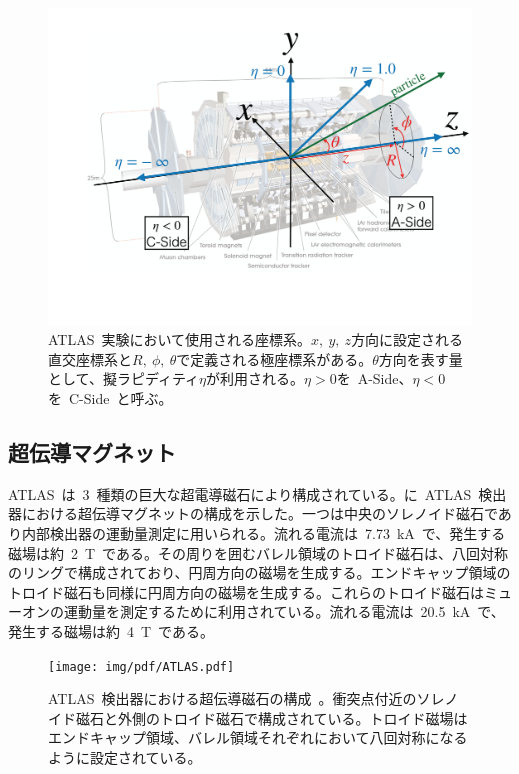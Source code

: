 \begin{figure}[H]
    \centering  
    \includegraphics[width=\textwidth,page=1]{img/pdf/cood.pdf}
    \caption[ATLAS~実験において使用される座標系]{ATLAS~実験において使用される座標系。$x,~y,~z$方向に設定される直交座標系と$R,~\phi,~\theta$で定義される極座標系がある。$\theta$方向を表す量として、擬ラピディティ$\eta$が利用される。$\eta>0$を~A-Side、$\eta<0$を~C-Side~と呼ぶ。}\label{fig:cood}
\end{figure}

\subsection{超伝導マグネット}
ATLAS~は~3~種類の巨大な超電導磁石により構成されている。に~ATLAS~検出器における超伝導マグネットの構成を示した。一つは中央のソレノイド磁石であり内部検出器の運動量測定に用いられる。流れる電流は~7.73~kA~で、発生する磁場は約~2~T~である。その周りを囲むバレル領域のトロイド磁石は、八回対称のリングで構成されており、円周方向の磁場を生成する。エンドキャップ領域のトロイド磁石も同様に円周方向の磁場を生成する。これらのトロイド磁石はミューオンの運動量を測定するために利用されている。流れる電流は~20.5~kA~で、発生する磁場は約~4~T~である。

\begin{figure}[H]
        \centering   
        \texttt{[image: img/pdf/ATLAS.pdf]}
        \caption[ATLAS~検出器における超伝導磁石の構成]{ATLAS~検出器における超伝導磁石の構成~\cite{TR:01}。衝突点付近のソレノイド磁石と外側のトロイド磁石で構成されている。トロイド磁場はエンドキャップ領域、バレル領域それぞれにおいて八回対称になるように設定されている。}\label{fig:mag}
\end{figure}


